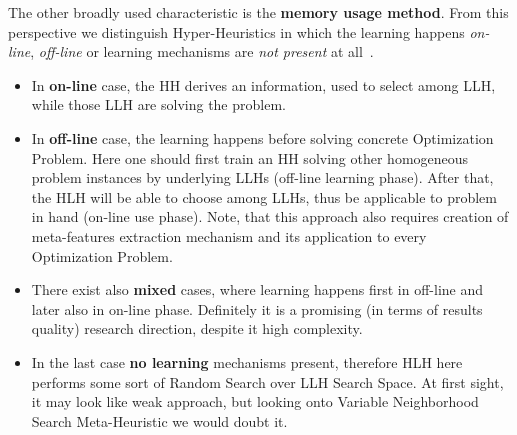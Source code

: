 The other broadly used characteristic is the \textbf{memory usage method}. 
From this perspective we distinguish Hyper-Heuristics in which the learning happens \textit{on-line}, \textit{off-line} or learning mechanisms are \textit{not present} at all~\cite{ryser2014review,burke2019classification}.
\begin{itemize}[itemsep=8pt]
	\item In \textbf{on-line} case, the HH derives an information, used to select among LLH, while those LLH are solving the problem.

	\item In \textbf{off-line} case, the learning happens before solving concrete Optimization Problem. Here one should first train an HH solving other homogeneous problem instances by underlying LLHs (off-line learning phase). After that, the HLH will be able to choose among LLHs, thus be applicable to problem in hand (on-line use phase). Note, that this approach also requires creation of meta-features extraction mechanism and its application to every Optimization Problem.

	\item There exist also \textbf{mixed} cases, where learning happens first in off-line and later also in on-line phase. Definitely it is a promising (in terms of results quality) research direction, despite it high complexity.
	
	\item In the last case \textbf{no learning} mechanisms present, therefore HLH here performs some sort of Random Search over LLH Search Space. At first sight, it may look like weak approach, but looking onto Variable Neighborhood Search Meta-Heuristic we would doubt it.
\end{itemize}



